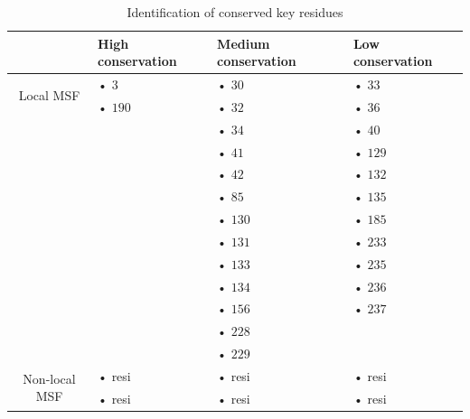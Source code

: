 \begin{table}[h!]
	\begin{tabular}{cp{4cm}p{5cm}p{4.5cm}}
		\hline
		\hline
		& High conservation & Medium conservation & Low conservation \\
		\hline
		\multirow{2}{*}{Local MSF} & •   $3$ & •  $30$ & • $33$ \\
		                           & • $190$ & •  $32$ & • $36$ \\
		                           &         & •  $34$ & • $40$ \\
		                           &         & •  $41$ & • $129$ \\
		                           &         & •  $42$ & • $132$ \\
		                           &         & •  $85$ & • $135$ \\
		                           &         & • $130$ & • $185$ \\
		                           &         & • $131$ & • $233$ \\
		                           &         & • $133$ & • $235$ \\
		                           &         & • $134$ & • $236$ \\
		                           &         & • $156$ & • $237$ \\
		                           &         & • $228$\\
		                           &         & • $229$\\
		\hline
		\multirow{2}{*}{Non-local MSF} & • resi & • resi & • resi \\
		                               & • resi & • resi & • resi \\
		\hline
		\hline
	\end{tabular}
	\caption{Identification of conserved key residues}
	\label{Final table}
\end{table}
